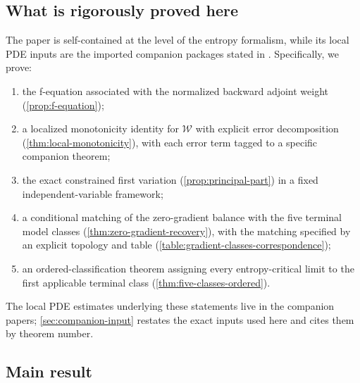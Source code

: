 \documentclass[11pt]{amsart}
\numberwithin{equation}{section}
\theoremstyle{plain}
\theoremstyle{definition}
\theoremstyle{remark}
\newcommand{\Wloc}{\mathcal W}
\begin{document}
\subsection*{What is rigorously proved here}

The paper is self-contained at the level of the entropy formalism, while its
local PDE inputs are the imported companion packages stated in
.
Specifically, we prove:

\begin{enumerate}[label=\textup{(\arabic*)},leftmargin=2.2em]
	\item the f-equation associated with the normalized backward adjoint
	weight (\cref{prop:f-equation});
	\item a localized monotonicity identity for \(\Wloc\) with explicit
	error decomposition (\cref{thm:local-monotonicity}), with each error term
	tagged to a specific companion theorem;
	\item the exact constrained first variation
	(\cref{prop:principal-part}) in a fixed independent-variable framework;
	\item a conditional matching of the zero-gradient balance with the five
	terminal model classes (\cref{thm:zero-gradient-recovery}), with the
	matching specified by an explicit topology and table
	(\cref{table:gradient-classes-correspondence});
	\item an ordered-classification theorem assigning every entropy-critical
	limit to the first applicable terminal class
	(\cref{thm:five-classes-ordered}).
\end{enumerate}

The local PDE estimates underlying these statements live in the companion
papers; \cref{sec:companion-input} restates the exact inputs used here and
cites them by theorem number.

\subsection*{Main result}
\end{document}

